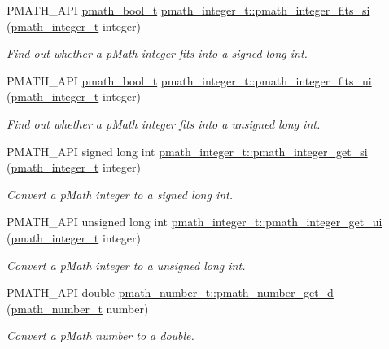 \begin{CompactItemize}
PMATH\_\-API \hyperlink{group__general__types_gc92090cb0b56345d6c379ed2341d4ef4}{pmath\_\-bool\_\-t} \hyperlink{group__numbers_gc220e06754067b9ba4a7c823017ad32e}{pmath\_\-integer\_\-t::pmath\_\-integer\_\-fits\_\-si} (\hyperlink{classpmath__integer__t}{pmath\_\-integer\_\-t} integer)
\begin{CompactList}\small\item\em Find out whether a pMath integer fits into a signed long int. \item\end{CompactList}\item 
PMATH\_\-API \hyperlink{group__general__types_gc92090cb0b56345d6c379ed2341d4ef4}{pmath\_\-bool\_\-t} \hyperlink{group__numbers_gb12e5e34b7918cb6beee23c57cdd0d36}{pmath\_\-integer\_\-t::pmath\_\-integer\_\-fits\_\-ui} (\hyperlink{classpmath__integer__t}{pmath\_\-integer\_\-t} integer)
\begin{CompactList}\small\item\em Find out whether a pMath integer fits into a unsigned long int. \item\end{CompactList}\item 
PMATH\_\-API signed long int \hyperlink{group__numbers_g12219f6f678ed0ddff66d352e0dabbd1}{pmath\_\-integer\_\-t::pmath\_\-integer\_\-get\_\-si} (\hyperlink{classpmath__integer__t}{pmath\_\-integer\_\-t} integer)
\begin{CompactList}\small\item\em Convert a pMath integer to a signed long int. \item\end{CompactList}\item 
PMATH\_\-API unsigned long int \hyperlink{group__numbers_g0aed3b6f38410b7e42ffa52be73c6ea6}{pmath\_\-integer\_\-t::pmath\_\-integer\_\-get\_\-ui} (\hyperlink{classpmath__integer__t}{pmath\_\-integer\_\-t} integer)
\begin{CompactList}\small\item\em Convert a pMath integer to a unsigned long int. \item\end{CompactList}\item 
PMATH\_\-API double \hyperlink{group__numbers_g62617cbeeedaff88caaafec1dc84f329}{pmath\_\-number\_\-t::pmath\_\-number\_\-get\_\-d} (\hyperlink{classpmath__number__t}{pmath\_\-number\_\-t} number)
\begin{CompactList}\small\item\em Convert a pMath number to a double. \item\end{CompactList}\item 

\end{CompactItemize}
